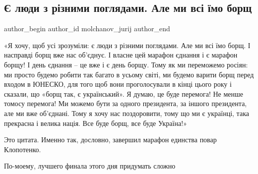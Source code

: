  
 
 
 
 
 
\subsection{Є люди з різними поглядами. Але ми всі їмо борщ}
\label{sec:16_02_2022.fb.molchanov_jurij.1.edinstvo_borsch}
 
\ifcmt
 author_begin
   author_id molchanov_jurij
 author_end
\fi

«Я хочу, щоб усі зрозуміли: є люди з різними поглядами. Але ми всі їмо борщ. І
насправді борщ вже нас об’єднує. І власне цей марафон єднання і є марафон
борщу! І день єднання – це вже і є день борщу. Тому як ми переможемо росіян: ми
просто будемо робити так багато в усьому світі, ми будемо варити борщ перед
входом в ЮНЕСКО, для того щоб вони проголосували в кінці цього року і сказали,
що «борщ так, є український». Я думаю, це буде перемога! Не менше томосу
перемога! Ми можемо бути за одного президента, за іншого президента, але ми вже
об’єднані. Тому я хочу нас поздоровити, тому що ми є українці, така прекрасна і
велика нація. Все буде борщ, все буде Україна!»


Это цитата. Именно так, дословно, завершил марафон единства повар Клопотенко.

По-моему, лучшего финала этого дня придумать сложно
